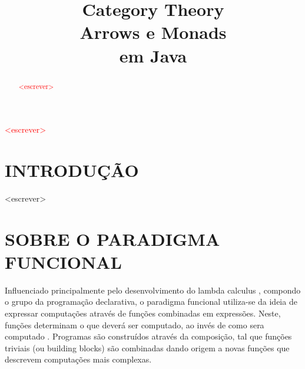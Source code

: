 \documentclass[10pt, conference]{IEEEtran}
\begin{document}

\title { 
	Category Theory \\
	Arrows e Monads \\
	em Java 
}

\author{


	\and	
	
}
					  
\maketitle

\thispagestyle{plain}
\pagestyle{plain}

\begin{abstract}

\textcolor{red}{<escrever>}

\end{abstract}

\begin{IEEEkeywords}

\textcolor{red}{<escrever>}

\end{IEEEkeywords}

\section{INTRODUÇÃO}
\label{sec:intro}

<escrever>

\section{SOBRE O PARADIGMA FUNCIONAL}
\label{sec:func-para}
Influenciado principalmente pelo desenvolvimento do lambda calculus \cite{hudak1989conception}, compondo o grupo da programação declarativa, o paradigma funcional utiliza-se da ideia de expressar computações através de funções combinadas em expressões. Neste, funções determinam o que deverá ser computado, ao invés de como sera computado \cite{louden2011programming}. Programas são construídos através da composição, tal que funções triviais (ou building blocks) são combinadas dando origem a novas funções que descrevem computações mais complexas.
\end{document}
